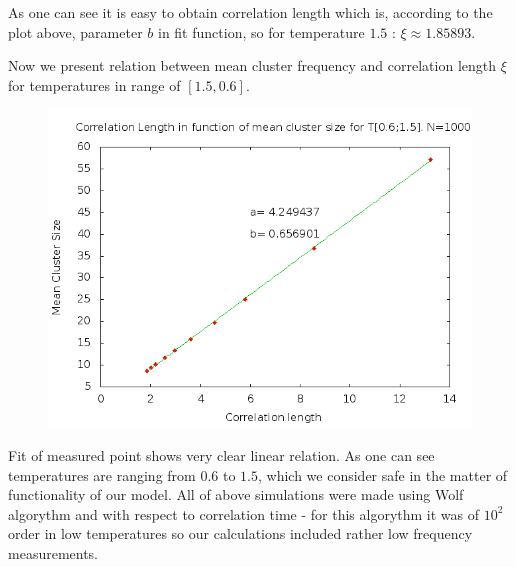 \documentclass[a4paper,12pt,titlepage]{article}
\begin{document}
  As one can see it is easy to obtain correlation length which is, according to the plot above, parameter $b$ in fit function, so for
  temperature $1.5$ : $\xi\approx 1.85893$.
  
  Now we present relation between mean cluster frequency and correlation length $\xi$ for temperatures in range of $\left[1.5,0.6\right]$.
  \begin{figure}[th]
    \centering
    \includegraphics[scale=0.49]{plots/IsingTestCLvsMCS.png}
  \end{figure}
  
  Fit of measured point shows very clear linear relation. As one can see temperatures are ranging from $0.6$ to $1.5$, which we consider
  safe in the matter of functionality of our model. All of above simulations were made using Wolf algorythm and with respect to correlation
  time - for this algorythm it was of $10^2$ order in low temperatures so our calculations included rather low frequency measurements.
  
\end{document}
